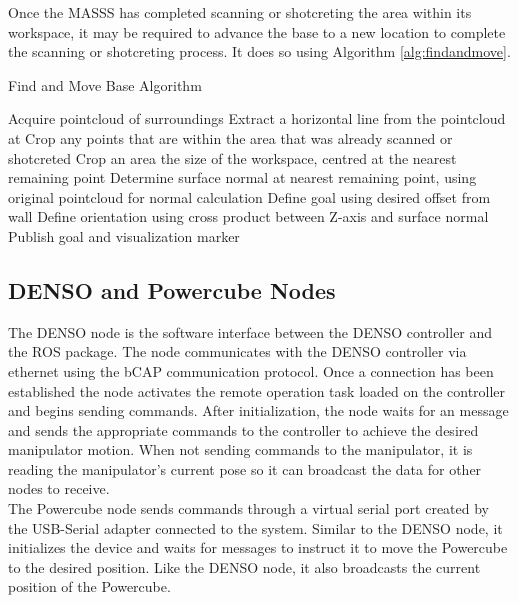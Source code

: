 Once the MASSS has completed scanning or shotcreting the area within its workspace, it may be required to advance the base to a new location to complete the scanning or shotcreting process. It does so using Algorithm \ref{alg:findandmove}.

\begin{algorithm}[H]
\caption{Find and Move Base Algorithm}
\label{alg:findandmove}
\begin{algorithmic}[1]
\State Acquire pointcloud of surroundings
\State Extract a horizontal line from the pointcloud at 
\State Crop any points that are within the area that was already scanned or shotcreted
\State Crop an area the size of the workspace, centred at the nearest remaining point
\State Determine surface normal at nearest remaining point, using original pointcloud for normal calculation
\State Define  goal using desired offset from wall
\State Define  orientation using cross product between Z-axis and surface normal
\State Publish  goal and visualization marker
\end{algorithmic}
\end{algorithm}

\subsection{DENSO and Powercube Nodes}
The DENSO node is the software interface between the DENSO controller and the ROS package. The node communicates with the DENSO controller via ethernet using the bCAP communication protocol. Once a connection has been established the node activates the remote operation task loaded on the controller and begins sending commands. After initialization, the node waits for an  message and sends the appropriate commands to the controller to achieve the desired manipulator motion. When not sending commands to the manipulator, it is reading the manipulator's current pose so it can broadcast the data for other nodes to receive.\\

The Powercube node sends commands through a virtual serial port created by the USB-Serial adapter connected to the system. Similar to the DENSO node, it initializes the device and waits for  messages to instruct it to move the Powercube to the desired position. Like the DENSO node, it also broadcasts the current position of the Powercube.\\
 
